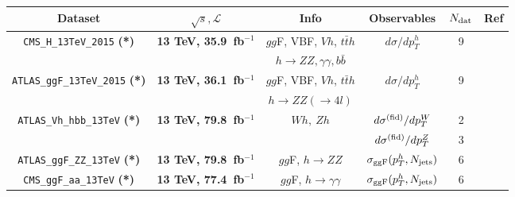 
\begin{table}[t]
  \centering
  \scriptsize
   \renewcommand{\arraystretch}{1.95}
  \begin{tabular}{c|c|c|c|c|c}
 Dataset   &  $\sqrt{s}, \mathcal{L}$ & Info  &  Observables  & $N_{\rm dat}$ & Ref   \\
 \toprule
  \multirow{2}{*}{ {\tt CMS\_H\_13TeV\_2015} {\bf (*)}}  &\multirow{2}{*}{ {\bf 13 TeV, 35.9~fb$^{-1}$}}  &
  $gg$F, VBF, $Vh$, $t\bar{t}h$ & \multirow{2}{*}{$d\sigma/dp_T^h$}    &   \multirow{2}{*}{9}    &  \multirow{2}{*}{ \cite{Sirunyan:2018sgc} } \\
     &  & $h\to ZZ,\gamma\gamma,b\bar{b}$
  &      &     &    \\
  \midrule
   \multirow{2}{*}{ {\tt ATLAS\_ggF\_13TeV\_2015} {\bf (*)}}  &\multirow{2}{*}{ {\bf 13 TeV, 36.1~fb$^{-1}$}}  &
  $gg$F, VBF, $Vh$, $t\bar{t}h$ &  \multirow{2}{*}{$d\sigma/dp_T^h$}    &   \multirow{2}{*}{9}    &  \multirow{2}{*}{ \cite{Aaboud:2018ezd} } \\
     &  & $h\to ZZ(\to 4l)$
  &      &     &    \\
  \midrule
   \midrule
    \multirow{2}{*}{ {\tt ATLAS\_Vh\_hbb\_13TeV} {\bf (*)}}  &\multirow{2}{*}{ {\bf 13 TeV, 79.8~fb$^{-1}$}}  &
    \multirow{2}{*}{$Wh,~Zh$} &  $d\sigma^{\rm (fid)}/dp_T^W$   &  2    &  \multirow{2}{*}{\cite{Aaboud:2019nan} } \\
    &   &     & $d\sigma^{\rm (fid)}/dp_T^Z$   & 3  &    \\ \midrule
     {\tt ATLAS\_ggF\_ZZ\_13TeV} {\bf (*)}  &{\bf 13 TeV, 79.8~fb$^{-1}$}  &
     $gg$F, $h\to ZZ$ &  $\sigma_{\rm ggF}(p_T^h,N_{\rm jets})$    &  6    &  \cite{Aad:2019mbh}  \\
     \midrule
    {\tt CMS\_ggF\_aa\_13TeV} {\bf (*)}  &{\bf 13 TeV, 77.4~fb$^{-1}$}  &
    $gg$F, $h\to \gamma\gamma$ &   $\sigma_{\rm ggF}(p_T^h,N_{\rm jets})$    &  6    &  \cite{CMS:1900lgv}  \\

\end{tabular}
\end{table}

